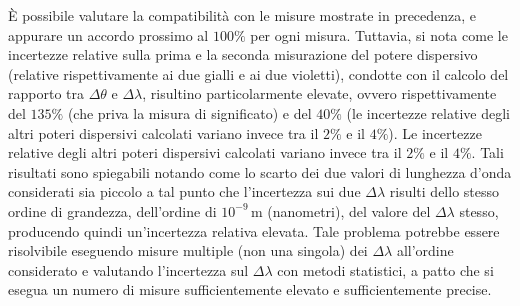 \documentclass[a4paper,12pt]{article}
\begin{document}
È possibile valutare la compatibilità con le misure mostrate in precedenza, e appurare un accordo prossimo al \( 100\% \) per ogni misura. Tuttavia, si nota come le incertezze relative sulla prima e la seconda misurazione del potere dispersivo (relative rispettivamente ai due gialli e ai due violetti), condotte con il calcolo del rapporto tra \( \Delta\theta \) e \( \Delta\lambda \), risultino particolarmente elevate, ovvero rispettivamente del \(135\%\) (che priva la misura di significato) e del \(40\%\) (le incertezze relative degli altri poteri dispersivi calcolati variano invece tra il \(2\%\) e il \(4\%\)).
Le incertezze relative degli altri poteri dispersivi calcolati variano invece tra il \( 2\% \) e il \( 4\% \).
Tali risultati sono spiegabili notando come lo scarto dei due valori di lunghezza d’onda considerati sia piccolo a tal punto che l’incertezza sui due \( \Delta\lambda \) risulti dello stesso ordine di grandezza, dell’ordine di \( 10^{-9} \, \text{m} \) (nanometri), del valore del \( \Delta\lambda \) stesso, producendo quindi un’incertezza relativa elevata.
Tale problema potrebbe essere risolvibile eseguendo misure multiple (non una singola) dei \( \Delta\lambda \) all’ordine considerato e valutando l’incertezza sul \( \Delta\lambda \) con metodi statistici, a patto che si esegua un numero di misure sufficientemente elevato e sufficientemente precise.
\end{document}
